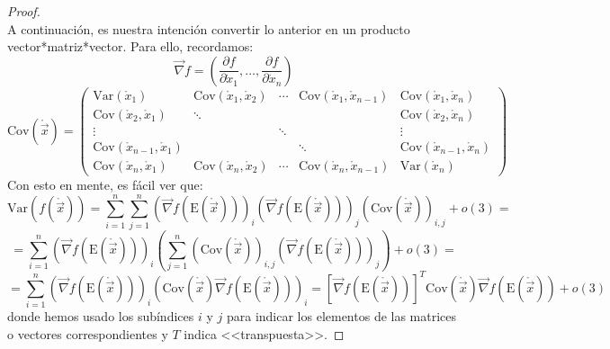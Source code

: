 \documentclass[11pt,a4paper,spanish]{article}
\numberwithin{equation}{section}
\numberwithin{table}{section}
\numberwithin{figure}{section}
\theoremstyle{definition}
\theoremstyle{remark}
\theoremstyle{definition}
\theoremstyle{remark}
\theoremstyle{plain}
\theoremstyle{plain}
\theoremstyle{plain}
\theoremstyle{plain}
\theoremstyle{plain}
\theoremstyle{plain}
\begin{document}
\begin{proof}
\[		\]
		A continuación, es nuestra intención convertir lo anterior en un producto
		vector{*}matriz{*}vector. Para ello, recordamos:
		\[
		\vec{\nabla}f=\left(\frac{\partial f}{\partial\dot{x}_{1}},\dots,\frac{\partial f}{\partial\dot{x}_{n}}\right)
		\]
		\[
		\mathrm{Cov}\left(\mathring{\vec{x}}\right)=\left(\begin{matrix}\mathrm{Var}\left(\mathring{x}_{1}\right) & \mathrm{Cov}\left(\mathring{x}_{1},\mathring{x}_{2}\right) & \cdots & \mathrm{Cov}\left(\mathring{x}_{1},\mathring{x}_{n-1}\right) & \mathrm{Cov}\left(\mathring{x}_{1},\mathring{x}_{n}\right)\\
			\mathrm{Cov}\left(\mathring{x}_{2},\mathring{x}_{1}\right) & \ddots &  &  & \mathrm{Cov}\left(\mathring{x}_{2},\mathring{x}_{n}\right)\\
			\vdots &  & \ddots &  & \vdots\\
			\mathrm{Cov}\left(\mathring{x}_{n-1},\mathring{x}_{1}\right) &  &  & \ddots & \mathrm{Cov}\left(\mathring{x}_{n-1},\mathring{x}_{n}\right)\\
			\mathrm{Cov}\left(\mathring{x}_{n},\mathring{x}_{1}\right) & \mathrm{Cov}\left(\mathring{x}_{n},\mathring{x}_{2}\right) & \cdots & \mathrm{Cov}\left(\mathring{x}_{n},\mathring{x}_{n-1}\right) & \mathrm{Var}\left(\mathring{x}_{n}\right)
		\end{matrix}\right)
		\]
		Con esto en mente, es fácil ver que:
		\[
		\mathrm{Var}\left(f\left(\mathring{\vec{x}}\right)\right)=\sum_{i=1}^{n}\sum_{j=1}^{n}\left(\vec{\nabla}f\left(\mathrm{E}\left(\mathring{\vec{x}}\right)\right)\right)_{i}\left(\vec{\nabla}f\left(\mathrm{E}\left(\mathring{\vec{x}}\right)\right)\right)_{j}\left(\mathrm{Cov}\left(\mathring{\vec{x}}\right)\right)_{i,j}+o\left(3\right)=
		\]
		\[
		=\sum_{i=1}^{n}\left(\vec{\nabla}f\left(\mathrm{E}\left(\mathring{\vec{x}}\right)\right)\right)_{i}\left(\sum_{j=1}^{n}\left(\mathrm{Cov}\left(\mathring{\vec{x}}\right)\right)_{i,j}\left(\vec{\nabla}f\left(\mathrm{E}\left(\mathring{\vec{x}}\right)\right)\right)_{j}\right)+o\left(3\right)=
		\]
		\[
		=\sum_{i=1}^{n}\left(\vec{\nabla}f\left(\mathrm{E}\left(\mathring{\vec{x}}\right)\right)\right)_{i}\left(\mathrm{Cov}\left(\mathring{\vec{x}}\right)\vec{\nabla}f\left(\mathrm{E}\left(\mathring{\vec{x}}\right)\right)\right)_{i}=\left[\vec{\nabla}f\left(\mathrm{E}\left(\mathring{\vec{x}}\right)\right)\right]^{T}\mathrm{Cov}\left(\mathring{\vec{x}}\right)\vec{\nabla}f\left(\mathrm{E}\left(\mathring{\vec{x}}\right)\right)+o\left(3\right)
		\]
		donde hemos usado los subíndices $i$ y $j$ para indicar los elementos
		de las matrices o vectores correspondientes y $T$ indica <<transpuesta>>.
	\end{proof}
\end{document}
